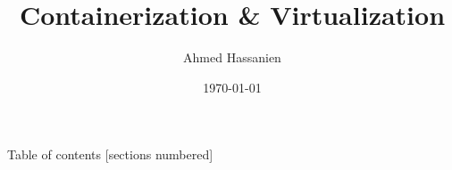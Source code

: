 \documentclass[aspectratio=169]{beamer}
\title{Containerization \& Virtualization}
\date{\today}
\author{Ahmed Hassanien}
\institute{Garage Education}
\begin{document}
    \maketitle

    \begin{frame}{Table of contents}
        [sections numbered]
        \tableofcontents[hideallsubsections]
    \end{frame}

    
    
    
    
    
\end{document}
